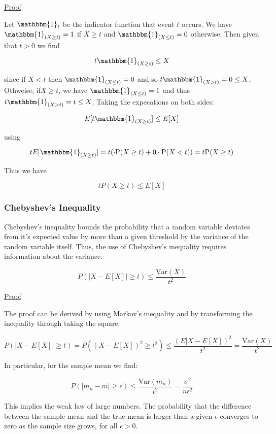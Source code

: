 \documentclass[12pt, authoryear]{elsarticle}
\begin{document}
\underline{Proof}

Let $\mathbbm{1}_t$ be the indicator function that event $t$ occurs.  We have $\mathbbm{1}_{(X \geq t)} = 1$ if $X \geq t$ and $\mathbbm{1}_{(X \leq t)} = 0$ otherwise. Then given that $t > 0$ we find

$$ t \mathbbm{1}_{(X \geq t)} \leq X $$

since if $X < t$ then $\mathbbm{1}_{(X \leq t)} = 0$ and so $t \mathbbm{1}_{( X > t ) } = 0 \leq X$. Othweise, if$X \geq t$, we have $\mathbbm{1}_{(X \leq t)} = 1$ and thus $t \mathbbm{1}_{( X > t ) } = t \leq X$. Taking the expecations on both sides:

$$ E[t \mathbbm{1}_{(X \geq t)}]  \leq E[X] $$

using 

$$ t E[\mathbbm{1}_{(X \geq t)}] =  t(  \cdot \mathrm { P } ( X \geq t ) + 0 \cdot \mathrm { P } ( X < t ) ) = t \mathrm { P } ( X \geq t )$$

Thus we have

$$ t P(X \geq t) \leq E[X] $$

\subsubsection{Chebyshev's Inequality} \label{chebyshev}

Chebyshev's inequality bounds the probability that a random variable deviates from it's expected value by more than a given threshold by the variance of the random variable itself. Thus, the use of Chebyshev's inequality requires information about the variance.

$$ P(| X - E[X] | \geq t) \leq \frac{\text{Var}(X)}{t^2}$$

\underline{Proof}

The proof can be derived by using Markov's inequality and by transforming the inequality through taking the square.

$$ P( | X- E[X] | \geq t) = P( (X - E[X] )^2 \geq t^2) \leq \frac{(E[X - E[X])^2}{t^2} = \frac{\text{Var}(X)}{t^2}$$

In particular, for the sample mean we find:

$$ P(| m_n - m | \geq \epsilon) \leq \frac{\text{Var}(m_n)}{t^2} = \frac{\sigma^2}{n\epsilon^2} $$

This implies the weak law of large numbers. The probability that the difference between the sample mean and the true mean is larger than a given $\epsilon$ converges to zero as the sample size grows, for all $\epsilon > 0 $.
\end{document}
